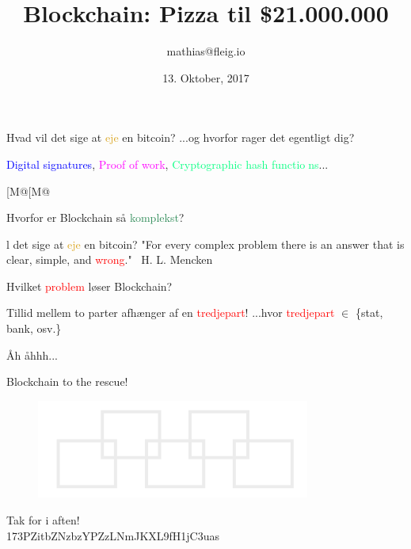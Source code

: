 \documentclass[usenames, dvipsnames]{beamer}
\title{Blockchain: Pizza til \$21.000.000}
\date{13. Oktober, 2017}
\author{mathias@fleig.io}
\institute{Datalogisk Institut \\ Københavns Universitet}
\begin{document}
  \maketitle
  \begin{frame}{}
    \center Hvad vil det sige at \textcolor{Goldenrod}{eje} en bitcoin?
    \center ...og hvorfor rager det egentligt dig?
  \end{frame}
  \begin{frame}{}
    \center \textcolor{blue}{Digital signatures}, \textcolor{Magenta}{Proof of work}, \center \textcolor{SpringGreen}{Cryptographic hash functions}...
  \end{frame}
  [M@[M@\begin{frame}{}
    \center Hvorfor er Blockchain så \textcolor{SeaGreen}{komplekst}?
  \end{frame}
  \begin{frame}{l det sige at \textcolor{Goldenrod}{eje} en bitcoin?}
      \center "For every complex problem there is an answer that is clear,
			   simple, and \textcolor{red}{wrong}." \textemdash \ H. L. Mencken
  \end{frame}
  \begin{frame}{}
    \center Hvilket \textcolor{red}{problem} løser Blockchain?
  \end{frame}
  \begin{frame}{}
    \center Tillid mellem to parter afhænger af en \textcolor{red}{tredjepart}!
	\center ...hvor \textcolor{red}{tredjepart} $\in$ \{stat, bank, osv.\}
  \end{frame}
  \begin{frame}{}
  \center Åh åhhh...
  \end{frame}
  \begin{frame}{}
	\center Blockchain to the rescue!
  \end{frame}
  \begin{frame}{}
  \end{frame}
  \begin{frame}{}
    \begin{figure}[ht!]
    \centering
    \includegraphics[width=90mm]{blockchain.png}
    \end{figure}
  \end{frame}
  \begin{frame}{}
    \center \LARGE Tak for i aften! \\
    \small \center 173PZitbZNzbzYPZzLNmJKXL9fH1jC3uas
  \end{frame}
\end{document}
